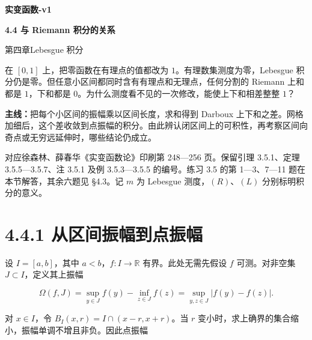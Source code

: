 \documentclass[11pt,a4paper]{article}
\begin{document}
\begin{center}{\LARGE\bfseries 实变函数-v1\par}\vspace{7pt}
{\Large\bfseries 4.4 与 Riemann 积分的关系\par}\vspace{6pt}
{第四章\quad Lebesgue 积分\par}\end{center}
在 \([0,1]\) 上，把零函数在有理点的值都改为
\(1\)。有理数集测度为零，Lebesgue
积分仍是零。但任意小区间都同时含有有理点和无理点，任何分割的 Riemann
上和都是 \(1\)，下和都是
\(0\)。为什么测度看不见的一次修改，能使上下和相差整整 \(1\)？
\par\textbf{主线：}把每个小区间的振幅乘以区间长度，求和得到 Darboux
上下和之差。网格加细后，这个差收敛到点振幅的积分。由此辨认闭区间上的可积性，再考察区间向奇点或无穷远延伸时，哪些结论仍成立。
\begin{center}
\end{center}
对应徐森林、薛春华《实变函数论》印刷第 248---256 页。保留引理
3.5.1、定理 3.5.5---3.5.7、注 3.5.1 及例 3.5.3---3.5.5 的编号。练习 3.5
的第 1---3、7---11 题在本节解答，其余六题见 §4.3。记 \(m\) 为 Lebesgue
测度，\((R)\)、\((L)\) 分别标明积分的意义。
\begingroup\small\setlength{\parskip}{0pt}\tableofcontents\endgroup
\newpage
{}\section[\S{}4.4.1
从区间振幅到点振幅]{4.4.1
从区间振幅到点振幅}\label{ux4eceux533aux95f4ux632fux5e45ux5230ux70b9ux632fux5e45}

设 \(I=[a,b]\)，其中 \(a<b\)，\(f:I\to\mathbb R\) 有界。此处无需先假设
\(f\) 可测。对非空集 \(J\subset I\)，定义其上振幅

\begin{equation*}
\Omega(f,J)=\sup_{y\in J}f(y)-\inf_{z\in J}f(z)
=\sup_{y,z\in J}|f(y)-f(z)|.
\end{equation*}

对 \(x\in I\)，令 \(B_I(x,r)=I\cap(x-r,x+r)\)。当 \(r\)
变小时，求上确界的集合缩小，振幅单调不增且非负。因此点振幅
\end{document}
